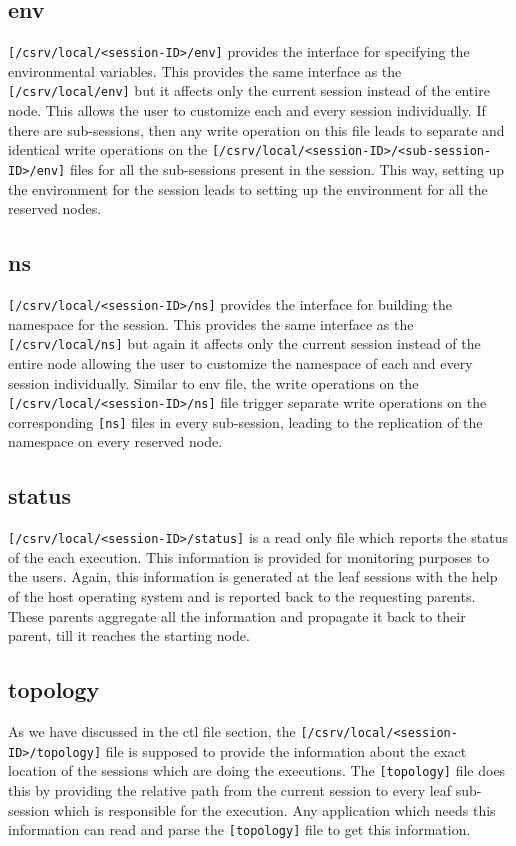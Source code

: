 \subsection{env}
\texttt{[/csrv/local/<session-ID>/env]} provides the interface for specifying
the environmental variables.  This provides the same interface as the
\texttt{[/csrv/local/env]} but it affects only the current session instead of
the entire node.  This allows the user to customize each and every session
individually.  If there are sub-sessions, then any write operation on this file
leads to separate and identical write operations on the
\texttt{[/csrv/local/<session-ID>/<sub-session-ID>/env]} files for all the
sub-sessions present in the session.  This way, setting up the environment for
the session leads to setting up the environment for all the reserved nodes.

\subsection{ns}
\texttt{[/csrv/local/<session-ID>/ns]} provides the interface for building the
namespace for the session. This provides the same interface as the
\texttt{[/csrv/local/ns]} but again it affects only the current session instead
of the entire node allowing the user to customize the namespace of each and
every session individually.  Similar to env file, the write operations on the
\texttt{[/csrv/local/<session-ID>/ns]} file trigger separate write operations
on the corresponding \texttt{[ns]} files in every sub-session, leading to
the replication of the namespace on every reserved node.


\subsection{status}
\texttt{[/csrv/local/<session-ID>/status]} is a read only file which reports
the status of the each execution. This information is provided for monitoring
purposes to the users.  Again, this information is generated at the leaf
sessions with the help of the host operating system and is reported back to the
requesting parents.  These parents aggregate all the information and propagate
it back to their parent, till it reaches the starting node.

\subsection{topology}
As we have discussed in the ctl file section, the
\texttt{[/csrv/local/<session-ID>/topology]} file is supposed to provide the
information about the exact location of the sessions which are doing the
executions. The \texttt{[topology]} file does this by providing the relative
path from the current session to every leaf sub-session which is responsible for
the execution.  Any application which needs this information can read and parse
the \texttt{[topology]} file to get this information.

